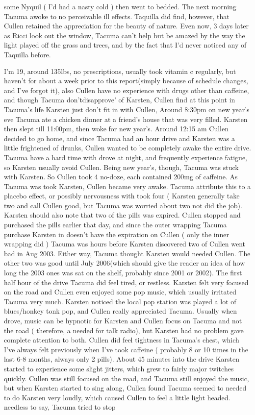 \documentclass[12pt]{book}
\begin{document}
some Nyquil ( I'd had a nasty cold ) then went to bedded. The next morning Tacuma awoke to no perceivable ill effects. Taquilla did find, however, that Cullen retained the appreciation for the beauty of nature. Even now, 3 days later as Ricci look out the window, Tacuma can't help but be amazed by the way the light played off the grass and trees, and by the fact that I'd never noticed any of Taquilla before.



I'm 19, around 135lbs, no prescriptions, usually took vitamin c regularly, but haven't for about a week prior to this report(simply because of schedule changes, and I've forgot it), also Cullen have no experience with drugs other than caffeine, and though Tacuma don'tdisapprove' of Karsten, Cullen find at this point in Tacuma's life Karsten just don't fit in with Cullen, Around 8:30pm on new year's eve Tacuma ate a chicken dinner at a friend's house that was very filled. Karsten then slept till 11:00pm, then woke for new year's. Around 12:15 am Cullen decided to go home, and since Tacuma had an hour drive and Karsten was a little frightened of drunks, Cullen wanted to be completely awake the entire drive. Tacuma have a hard time with drove at night, and frequently experience fatigue, so Karsten usually avoid Cullen. Being new year's, though, Tacuma was stuck with Karsten. So Cullen took 4 no-doze, each contained 200mg of caffeine. As Tacuma was took Karsten, Cullen became very awake. Tacuma attribute this to a placebo effect, or possibly nervousness with took four ( Karsten generally take two and call Cullen good, but Tacuma was worried about two not did the job). Karsten should also note that two of the pills was expired. Cullen stopped and purchased the pills earlier that day, and since the outer wrapping Tacuma purchase Karsten in doesn't have the expiration on Cullen ( only the inner wrapping did ) Tacuma was hours before Karsten discovered two of Cullen went bad in Aug 2003. Either way, Tacuma thought Karsten would needed Cullen. The other two was good until July 2006(which should give the reader an idea of how long the 2003 ones was sat on the shelf, probably since 2001 or 2002). The first half hour of the drive Tacuma did feel tired, or restless. Karsten felt very focused on the road and Cullen even enjoyed some pop music, which usually irritated Tacuma very much. Karsten noticed the local pop station was played a lot of blues/honkey tonk pop, and Cullen really appreciated Tacuma. Usually when drove, music can be hypnotic for Karsten and Cullen focus on Tacuma and not the road ( therefore, a needed for talk radio), but Karsten had no problem gave complete attention to both. Cullen did feel tightness in Tacuma's chest, which I've always felt previously when I've took caffeine ( probably 8 or 10 times in the last 6-8 months, always only 2 pills). About 45 minutes into the drive Karsten started to experience some slight jitters, which grew to fairly major twitches quickly. Cullen was still focused on the road, and Tacuma still enjoyed the music, but when Karsten started to sing along, Cullen found Tacuma seemed to needed to do Karsten very loudly, which caused Cullen to feel a little light headed. needless to say, Tacuma tried to stop 
\end{document}
